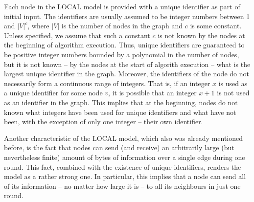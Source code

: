 Each node in the LOCAL model is provided with a unique identifier as part of initial input.
The identifiers are usually assumed to be integer numbers between 1 and $|V|^c$, where
$|V|$ is the number of nodes in the graph and $c$ is some constant. Unless specified, we
assume that such a constant $c$ is not known by the nodes at the beginning of
algorithm execution. Thus, unique identifiers are guaranteed to be positive integer
numbers bounded by a polynomial in the number of nodes, but it is not known -- by the nodes
at the start of algorith execution -- what is the largest unique identifier in the graph. Moreover,
the identifiers of the node do not necessarily form a continuous range of integers. That is,
if an integer $x$ is used as a unique identifier for some node $v$, it is possible
that an integer $x+1$ is not used as an identifier in the graph. This implies that at
the beginning, nodes do not known what integers have been used for unique identifiers
and what have not been, with the exception of only one integer -- their own identifier.

Another characteristic of the LOCAL model, which also was already mentioned before, is the fact
that nodes can send (and receive) an arbitrarily large (but nevertheless finite)
amount of bytes of information over a single edge during one round. This fact,
combined with the existence of unique identifiers, renders the model as a rather strong one.
In particular, this implies that a node can send all of its information -- no matter how
large it is -- to all its neighbours in just one round.

